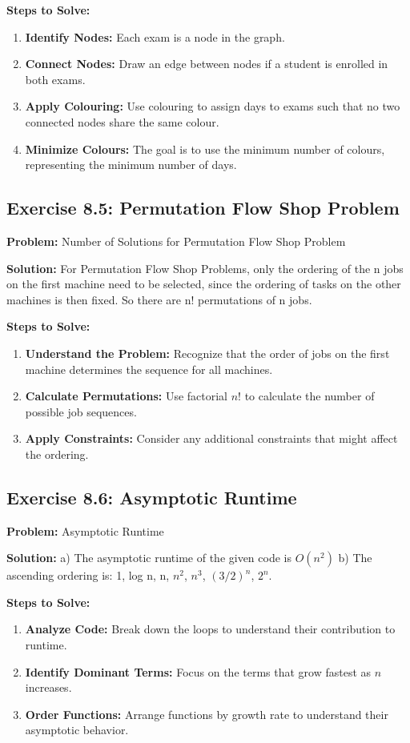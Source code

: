\textbf{Steps to Solve:}
\begin{enumerate}
\item \textbf{Identify Nodes:} Each exam is a node in the graph.
\item \textbf{Connect Nodes:} Draw an edge between nodes if a student is enrolled in both exams.
\item \textbf{Apply Colouring:} Use colouring to assign days to exams such that no two connected nodes share the same colour.
\item \textbf{Minimize Colours:} The goal is to use the minimum number of colours, representing the minimum number of days.
\end{enumerate}

\subsection{Exercise 8.5: Permutation Flow Shop Problem}
\textbf{Problem:} Number of Solutions for Permutation Flow Shop Problem

\textbf{Solution:}
For Permutation Flow Shop Problems, only the ordering of the n jobs on the first machine need to be selected, since the ordering of tasks on the other machines is then fixed. So there are n! permutations of n jobs.

\textbf{Steps to Solve:}
\begin{enumerate}
\item \textbf{Understand the Problem:} Recognize that the order of jobs on the first machine determines the sequence for all machines.
\item \textbf{Calculate Permutations:} Use factorial $n!$ to calculate the number of possible job sequences.
\item \textbf{Apply Constraints:} Consider any additional constraints that might affect the ordering.
\end{enumerate}

\subsection{Exercise 8.6: Asymptotic Runtime}
\textbf{Problem:} Asymptotic Runtime

\textbf{Solution:}
a) The asymptotic runtime of the given code is $O(n^2)$
b) The ascending ordering is: 1, log n, n, $n^2$, $n^3$, $(3/2)^n$, $2^n$.

\textbf{Steps to Solve:}
\begin{enumerate}
\item \textbf{Analyze Code:} Break down the loops to understand their contribution to runtime.
\item \textbf{Identify Dominant Terms:} Focus on the terms that grow fastest as $n$ increases.
\item \textbf{Order Functions:} Arrange functions by growth rate to understand their asymptotic behavior.
\end{enumerate}

